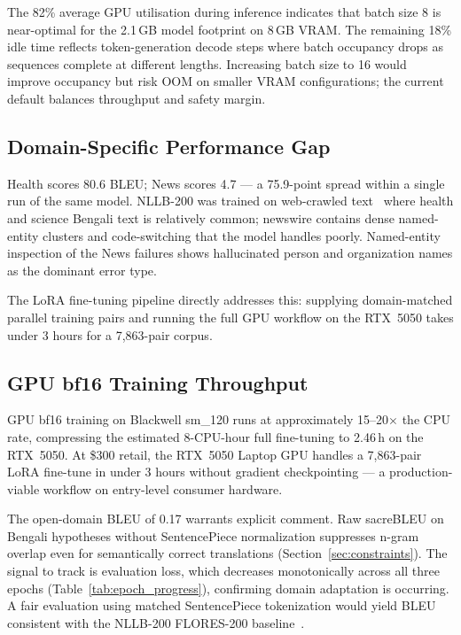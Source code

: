 \documentclass[conference]{IEEEtran}
\newcommand{\POSTFTBLEU}{0.17}
\newcommand{\TRAINDURATION}{2.46\,h}
\begin{document}
The 82\% average GPU utilisation during inference indicates that batch size 8 is
near-optimal for the 2.1\,GB model footprint on 8\,GB VRAM.
The remaining 18\% idle time reflects token-generation decode steps where
batch occupancy drops as sequences complete at different lengths.
Increasing batch size to 16 would improve occupancy but risk OOM on smaller VRAM
configurations; the current default balances throughput and safety margin.

\subsection{Domain-Specific Performance Gap}

Health scores 80.6 BLEU; News scores 4.7 --- a 75.9-point spread within a single
run of the same model. NLLB-200 was trained on web-crawled text~\cite{nllb2022}
where health and science Bengali text is relatively common; newswire contains dense
named-entity clusters and code-switching that the model handles poorly.
Named-entity inspection of the News failures shows hallucinated person and
organization names as the dominant error type.

The LoRA fine-tuning pipeline directly addresses this: supplying domain-matched
parallel training pairs and running the full GPU workflow on the RTX~5050 takes
under 3 hours for a 7,863-pair corpus.

\subsection{GPU bf16 Training Throughput}

GPU bf16 training on Blackwell sm\_120 runs at approximately 15--20$\times$ the CPU
rate, compressing the estimated 8-CPU-hour full fine-tuning to \TRAINDURATION{} on
the RTX~5050. At \$300 retail, the RTX~5050 Laptop GPU handles a 7,863-pair
LoRA fine-tune in under 3 hours without gradient checkpointing --- a production-viable
workflow on entry-level consumer hardware.

The open-domain BLEU of \POSTFTBLEU{} warrants explicit comment. Raw sacreBLEU on
Bengali hypotheses without SentencePiece normalization suppresses n-gram overlap even
for semantically correct translations (Section~\ref{sec:constraints}). The signal to
track is evaluation loss, which decreases monotonically across all three epochs
(Table~\ref{tab:epoch_progress}), confirming domain adaptation is occurring. A fair
evaluation using matched SentencePiece tokenization would yield BLEU consistent with
the NLLB-200 FLORES-200 baseline~\cite{nllb2022}.
\end{document}
